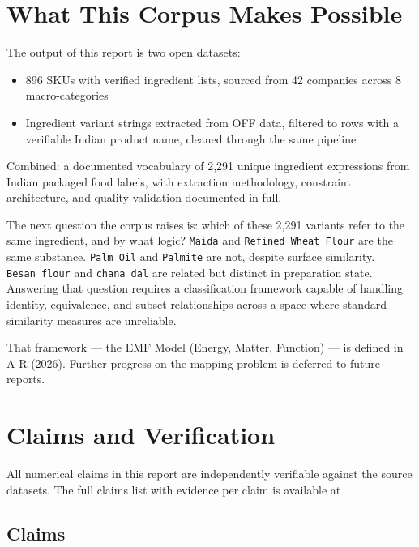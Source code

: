 \documentclass[
  letterpaper,
  DIV=11,
  numbers=noendperiod]{scrartcl}
\providecommand{\tightlist}{%
  \setlength{\itemsep}{0pt}\setlength{\parskip}{0pt}}
\begin{document}
\section{What This Corpus Makes
Possible}\label{what-this-corpus-makes-possible}

The output of this report is two open datasets:

\begin{itemize}
\tightlist
\item
  896 SKUs with verified ingredient lists, sourced from 42 companies
  across 8 macro-categories
\item
  Ingredient variant strings extracted from OFF data, filtered to rows
  with a verifiable Indian product name, cleaned through the same
  pipeline
\end{itemize}

Combined: a documented vocabulary of 2,291 unique ingredient expressions
from Indian packaged food labels, with extraction methodology,
constraint architecture, and quality validation documented in full.

The next question the corpus raises is: which of these 2,291 variants
refer to the same ingredient, and by what logic? \texttt{Maida} and
\texttt{Refined\ Wheat\ Flour} are the same substance.
\texttt{Palm\ Oil} and \texttt{Palmite} are not, despite surface
similarity. \texttt{Besan\ flour} and \texttt{chana\ dal} are related
but distinct in preparation state. Answering that question requires a
classification framework capable of handling identity, equivalence, and
subset relationships across a space where standard similarity measures
are unreliable.

That framework --- the EMF Model (Energy, Matter, Function) --- is
defined in A R (2026). Further progress on the mapping problem is
deferred to future reports.

\section{Claims and Verification}\label{claims-and-verification}

All numerical claims in this report are independently verifiable against
the source datasets. The full claims list with evidence per claim is
available at

\subsection{Claims}\label{claims}
\end{document}
